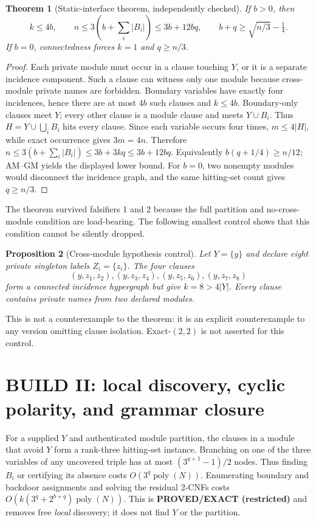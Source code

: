 \documentclass[11pt]{article}
\newtheorem{theorem}{Theorem}
\newtheorem{proposition}[theorem]{Proposition}
\begin{document}
\begin{theorem}[Static-interface theorem, independently checked]
If $b>0$, then
\[
 k\le4b,\qquad
 n\le3\left(b+\sum_i|B_i|\right)\le3b+12bq,
 \qquad b+q\ge\sqrt{n/3}-\tfrac14.
\]
If $b=0$, connectedness forces $k=1$ and $q\ge n/3$.
\end{theorem}
\begin{proof}
Each private module must occur in a clause touching $Y$, or it is a separate
incidence component.  Such a clause can witness only one module because
cross-module private names are forbidden.  Boundary variables have exactly
four incidences, hence there are at most $4b$ such clauses and $k\le4b$.
Boundary-only clauses meet $Y$; every other clause is a module clause and
meets $Y\cup B_i$.  Thus $H=Y\cup\bigcup_iB_i$ hits every clause.  Since each
variable occurs four times, $m\le4|H|$, while exact occurrence gives
$3m=4n$.  Therefore
$n\le3(b+\sum_i|B_i|)\le3b+3kq\le3b+12bq$.
Equivalently $b(q+1/4)\ge n/12$; AM--GM yields the displayed lower bound.
For $b=0$, two nonempty modules would disconnect the incidence graph, and
the same hitting-set count gives $q\ge n/3$.
\end{proof}

The theorem survived falsifiers 1 and 2 because the full partition and
no-cross-module condition are load-bearing.  The following smallest control
shows that this condition cannot be silently dropped.

\begin{proposition}[Cross-module hypothesis control]
Let $Y=\{y\}$ and declare eight private singleton labels
$Z_i=\{z_i\}$.  The four clauses
\[
 (y,z_1,z_2),(y,z_3,z_4),(y,z_5,z_6),(y,z_7,z_8)
\]
form a connected incidence hypergraph but give $k=8>4|Y|$.
Every clause contains private names from two declared modules.
\end{proposition}
This is not a counterexample to the theorem: it is an explicit counterexample
to any version omitting clause isolation.  Exact-$(2,2)$ is not asserted for
this control.

\section{BUILD II: local discovery, cyclic polarity, and grammar closure}
For a supplied $Y$ and authenticated module partition, the clauses in a
module that avoid $Y$ form a rank-three hitting-set instance.  Branching on
one of the three variables of any uncovered triple has at most
$(3^{q+1}-1)/2$ nodes.  Thus finding $B_i$ or certifying its absence costs
$O(3^q\operatorname{poly}(N))$.  Enumerating boundary and backdoor assignments
and solving the residual 2-CNFs costs
$O(k(3^q+2^{b+q})\operatorname{poly}(N))$.  This is
\textbf{PROVED/EXACT (restricted)} and removes free \emph{local} discovery;
it does not find $Y$ or the partition.
\end{document}
